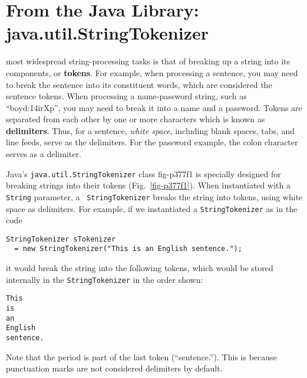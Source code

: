 \section{From the Java Library: \\java.util.StringTokenizer}
\label{fromthe-java-libraryjavautil-string-tokenizer}

 most widespread string-processing tasks is that
of breaking \WWWjava up a string into its components, or {\bf tokens}.
For example, when processing a sentence, you may need to break the
sentence into its constituent words, which are considered the sentence
tokens.  When processing a name-password string, such as
``boyd:14irXp'', you may need to break it into a name and a password.
Tokens are separated from each other by one or more characters which
is known as {\bf delimiters}. Thus, for a sentence, {\em white space},
including blank spaces, tabs, and line feeds, serve as the delimiters.
For the password example, the colon character serves as a delimiter.

Java's {\tt java.util.StringTokenizer} class
{fig-p377f1}
is specially designed for breaking strings into their tokens
(Fig.~\ref{fig-p377f1}). When instantiated with a {\tt String} parameter, a {\tt
StringTokenizer} breaks the string into tokens, using white space as
delimiters.  For example, if we instantiated a {\tt StringTokenizer}
as in the code

\begin{jjjlisting}
\begin{lstlisting}
StringTokenizer sTokenizer
  = new StringTokenizer("This is an English sentence.");
\end{lstlisting}
\end{jjjlisting}

\noindent it would break the string into the following
tokens, which would be stored internally in the {\tt StringTokenizer}
in the  order shown:

\begin{jjjlisting}
\begin{lstlisting}
This
is
an
English
sentence.
\end{lstlisting}
\end{jjjlisting}

\noindent Note that the period is part of the last token
(``sentence.''). This is because punctuation marks are not
considered delimiters by default.  

